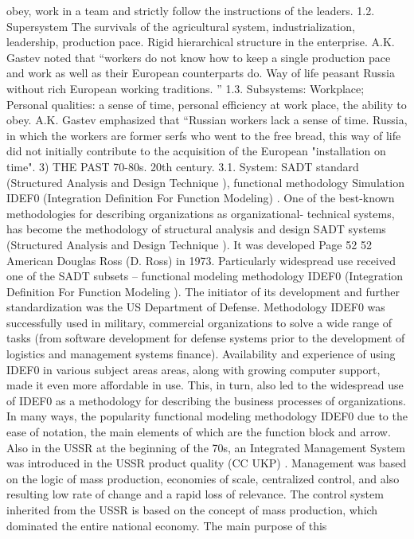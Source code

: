 obey, work in a team and strictly follow the instructions of the leaders.
1.2.
Supersystem
The survivals of the agricultural system, industrialization, leadership, production pace.
Rigid hierarchical structure in the enterprise.
A.K. Gastev noted that “workers do not know how to keep a single production pace
and work as well as their European counterparts do. Way of life
peasant Russia without rich European working traditions. ”
1.3.
Subsystems:
Workplace; Personal qualities: a sense of time, personal efficiency at work
place, the ability to obey.
A.K. Gastev emphasized that “Russian workers lack a sense of time.
Russia, in which the workers are former serfs who went to the free
bread, this way of life did not initially contribute to the acquisition of the European "installation on
time".
3) THE PAST 70-80s. 20th century.
3.1. System:
SADT standard (Structured Analysis and Design Technique ), functional methodology
Simulation IDEF0 (Integration Definition For Function Modeling) .
One of the best-known methodologies for describing organizations as organizational-
technical systems, has become the methodology of structural analysis and design
SADT systems (Structured Analysis and Design Technique ). It was developed
Page 52
52
American Douglas Ross (D. Ross) in 1973. Particularly widespread use
received one of the SADT subsets -- functional modeling methodology
IDEF0 (Integration Definition For Function Modeling ). The initiator of its development
and further standardization was the US Department of Defense. Methodology
IDEF0 was successfully used in military, commercial organizations to solve
a wide range of tasks (from software development for defense
systems prior to the development of logistics and management systems
finance). Availability and experience of using IDEF0 in various subject areas
areas, along with growing computer support, made it even more affordable
in use. This, in turn, also led to the widespread use of IDEF0
as a methodology for describing the business processes of organizations. In many ways, the popularity
functional modeling methodology IDEF0 due to the ease of notation,
the main elements of which are the function block and arrow.
Also in the USSR at the beginning of the 70s, an Integrated Management System was introduced in the USSR
product quality (CC UKP) . Management was based on the logic of mass
production, economies of scale, centralized control, and also resulting
low rate of change and a rapid loss of relevance.
The control system inherited from the USSR is based on the concept of mass
production, which dominated the entire national economy. The main purpose of this
